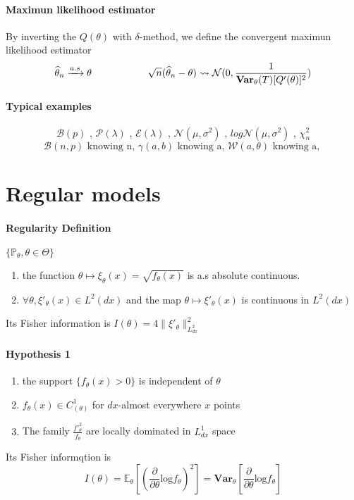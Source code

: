 \documentclass[a4paper,10pt]{article}
\begin{document}
\paragraph{Maximun likelihood estimator}
By inverting the $Q(\theta)$ with $\delta$-method, we define the convergent maximun likelihood estimator 
\[
\widehat{\theta}_n \xrightarrow{a.s} \theta 
\hspace{20mm}
\sqrt{n}(\widehat{\theta}_n - \theta ) \rightsquigarrow   \mathcal{N}(0,\frac{1}{\textbf{Var}_{\theta}(T)[Q'(\theta)]^2  } )
\]
\paragraph{Typical examples}
\[
\mathcal{B}(p)
\text{ , }
\mathcal{P}(\lambda)
\text{ , }
\mathcal{E}(\lambda)
\text{ , }
\mathcal{N}(\mu,\sigma^2)
\text{ , }
log\mathcal{N}(\mu,\sigma^2)
\text{ , }
\chi^2_n
\]
\[
\mathcal{B}(n,p) \text{ knowing n, }
\gamma(a,b) \text{ knowing a,  }
\mathcal{W}(a,\theta) \text{ knowing a, }
\]

\section{Regular models}
\paragraph{Regularity Definition}  $\{\mathbb{P}_{\theta},\theta \in \Theta\}$
\begin{enumerate}
 \item the function $\theta \mapsto \xi_{\theta}(x)=\sqrt{f_{\theta}(x)}$ is a.s absolute continuous.
 \item $\forall \theta, \xi'_{\theta}(x) \in L^2(dx)$ and the map $\theta \mapsto \xi'_{\theta}(x)$ is continuous in $L^2(dx)$
\end{enumerate}
Its Fisher information is $I(\theta) = 4 \| \xi'_{\theta} \|^{2}_{L^2_{dx}}$
\paragraph{Hypothesis 1}
\begin{enumerate}
 \item the support $\{f_{\theta}(x)>0\}$ is independent of $\theta$
 \item $f_{\theta}(x) \in C^1_{(\theta)}$ for $dx$-almost everywhere $x$ points  
 \item The family {$\frac{f'^2_{\theta}}{f_{\theta}} $} are locally dominated in $L^1_{dx}$ space
\end{enumerate}
Its Fisher informqtion is 
\[
I(\theta) 
= \mathbb{E}_{\theta}[( \frac{\partial}{\partial \theta} \text{log}f_{\theta} )^2]
= \textbf{Var}_{\theta} [ \frac{\partial}{\partial \theta} \text{log} f_{\theta}]  
\]
\end{document}
